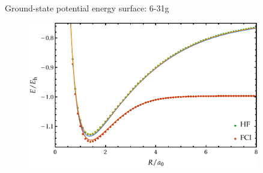 \documentclass[10pt]{beamer}
\begin{document}
\begin{frame}{Ground-state potential energy surface:  6-31g}
  \begin{figure}
    \includegraphics[width=0.9\textwidth]{Figures/fig_4.pdf}
  \end{figure}
\end{frame}
\end{document}
